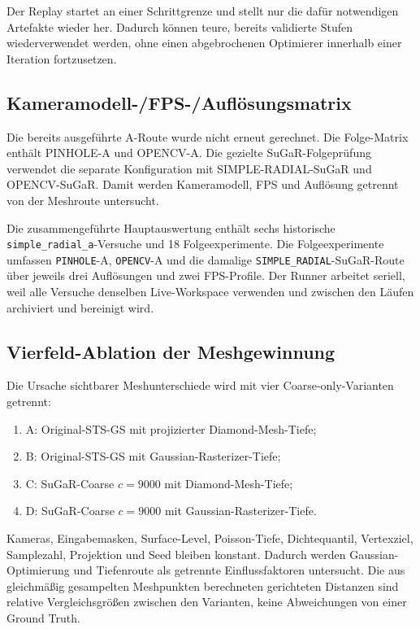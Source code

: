 Der Replay startet an einer Schrittgrenze und stellt nur die dafür notwendigen
Artefakte wieder her. Dadurch können teure, bereits validierte Stufen
wiederverwendet werden, ohne einen abgebrochenen Optimierer innerhalb einer
Iteration fortzusetzen.

\subsection{Kameramodell-/FPS-/Auflösungsmatrix}

Die bereits ausgeführte A-Route wurde nicht erneut gerechnet. Die Folge-Matrix
 enthält PINHOLE-A und OPENCV-A. Die gezielte
SuGaR-Folgeprüfung verwendet die separate Konfiguration
 mit SIMPLE-RADIAL-SuGaR und
OPENCV-SuGaR. Damit werden Kameramodell, FPS und Auflösung getrennt von der
Meshroute untersucht.

Die zusammengeführte Hauptauswertung enthält sechs historische
\texttt{simple\_radial\_a}-Versuche und 18 Folgeexperimente. Die Folgeexperimente
umfassen \texttt{PINHOLE}-A, \texttt{OPENCV}-A und die damalige
\texttt{SIMPLE\_RADIAL}-SuGaR-Route über jeweils drei Auflösungen und zwei
FPS-Profile. Der Runner arbeitet seriell, weil alle Versuche denselben
Live-Workspace verwenden und zwischen den Läufen archiviert und bereinigt wird.

\subsection{Vierfeld-Ablation der Meshgewinnung}

Die Ursache sichtbarer Meshunterschiede wird mit vier Coarse-only-Varianten
getrennt:

\begin{enumerate}
  \item A: Original-STS-GS mit projizierter Diamond-Mesh-Tiefe;
  \item B: Original-STS-GS mit Gaussian-Rasterizer-Tiefe;
  \item C: SuGaR-Coarse $c=9000$ mit Diamond-Mesh-Tiefe;
  \item D: SuGaR-Coarse $c=9000$ mit Gaussian-Rasterizer-Tiefe.
\end{enumerate}

Kameras, Eingabemasken, Surface-Level, Poisson-Tiefe, Dichtequantil,
Vertexziel, Samplezahl, Projektion und Seed bleiben konstant. Dadurch werden
Gaussian-Optimierung und Tiefenroute als getrennte Einflussfaktoren untersucht.
Die aus gleichmäßig gesampelten Meshpunkten berechneten gerichteten Distanzen
sind relative Vergleichsgrößen zwischen den Varianten, keine Abweichungen von
einer Ground Truth.

